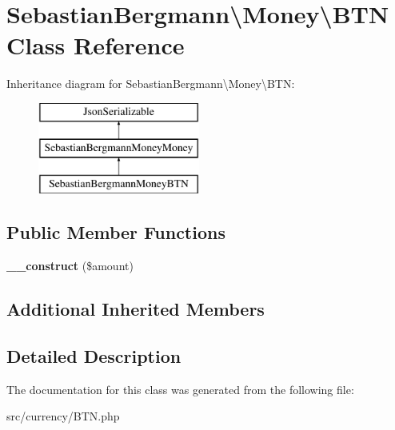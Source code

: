 \hypertarget{classSebastianBergmann_1_1Money_1_1BTN}{}\section{Sebastian\+Bergmann\textbackslash{}Money\textbackslash{}B\+T\+N Class Reference}
\label{classSebastianBergmann_1_1Money_1_1BTN}
Inheritance diagram for Sebastian\+Bergmann\textbackslash{}Money\textbackslash{}B\+T\+N\+:\begin{figure}[H]
\begin{center}
\leavevmode
\includegraphics[height=3.000000cm]{classSebastianBergmann_1_1Money_1_1BTN}
\end{center}
\end{figure}
\subsection*{Public Member Functions}
\begin{DoxyCompactItemize}
\item 
\hypertarget{classSebastianBergmann_1_1Money_1_1BTN_a92526ac64eca69cf619ed0a13f64082f}{}{\bfseries \+\_\+\+\_\+construct} (\$amount)\label{classSebastianBergmann_1_1Money_1_1BTN_a92526ac64eca69cf619ed0a13f64082f}

\end{DoxyCompactItemize}
\subsection*{Additional Inherited Members}


\subsection{Detailed Description}


The documentation for this class was generated from the following file\+:\begin{DoxyCompactItemize}
\item 
src/currency/B\+T\+N.\+php\end{DoxyCompactItemize}
